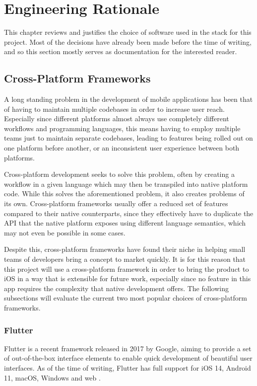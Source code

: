 \chapter{Engineering Rationale}
This chapter reviews and justifies the choice of software used in the stack for this project. Most of the decisions have already been made before the time of writing, and so this section mostly serves as documentation for the interested reader.

\section{Cross-Platform Frameworks}
A long standing problem in the development of mobile applications has been that of having to maintain multiple codebases in order to increase user reach. Especially since different platforms almost always use completely different workflows and programming languages, this means having to employ multiple teams just to maintain separate codebases, leading to features being rolled out on one platform before another, or an inconsistent user experience between both platforms.

Cross-platform development seeks to solve this problem, often by creating a workflow in a given language which may then be transpiled into native platform code. While this solves the aforementioned problem, it also creates problems of its own. Cross-platform frameworks usually offer a reduced set of features compared to their native counterparts, since they effectively have to duplicate the API that the native platform exposes using different language semantics, which may not even be possible in some cases.

Despite this, cross-platform frameworks have found their niche in helping small teams of developers bring a concept to market quickly. It is for this reason that this project will use a cross-platform framework in order to bring the product to iOS in a way that is extensible for future work, especially since no feature in this app requires the complexity that native development offers. The following subsections will evaluate the current two most popular choices of cross-platform frameworks.

\subsection{Flutter}
Flutter is a recent framework released in 2017 by Google, aiming to provide a set of out-of-the-box interface elements to enable quick development of beautiful user interfaces. As of the time of writing, Flutter has full support for iOS 14, Android 11, macOS, Windows and web \cite{fluttersupportedplatforms}.

